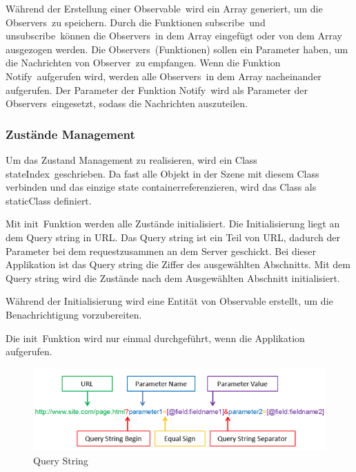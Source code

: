   Während der Erstellung einer \glqq Observable\grqq\ wird ein Array generiert, um die \glqq Observers\grqq\ zu speichern. Durch die Funktionen \glqq subscribe\grqq\ und \glqq unsubscribe\grqq\ können die \glqq Observers\grqq\ in dem Array eingefügt oder von dem Array ausgezogen werden. Die \glqq Observers\grqq\ (Funktionen) sollen ein Parameter haben, um die Nachrichten von \glqq Observer\grqq\ zu empfangen. Wenn die Funktion \glqq Notify\grqq\ aufgerufen wird, werden alle \glqq Observers\grqq\ in dem Array nacheinander aufgerufen. Der Parameter der Funktion \glqq Notify\grqq\ wird als Parameter der \glqq Observers\grqq\ eingesetzt, sodass die Nachrichten auszuteilen.
  
  \subsubsection{Zustände Management}
  
  Um das Zustand Management zu realisieren, wird ein Class \glqq stateIndex\grqq\ geschrieben. Da fast alle Objekt in der Szene mit diesem Class verbinden und das einzige \glqq state container\grqq referenzieren, wird das Class als \glqq static\grqq Class definiert.
  
  Mit \glqq init\grqq\ Funktion werden alle Zustände initialisiert. Die Initialisierung liegt an dem Query string in URL. Das Query string ist ein Teil von URL, dadurch der  Parameter bei dem \glqq request\grqq zusammen an dem Server geschickt. Bei dieser Applikation ist das Query string die Ziffer des ausgewählten Abschnitts. Mit dem Query string wird die Zustände nach dem Ausgewählten Abschnitt initialisiert.
  
  Während der Initialisierung wird eine Entität von Observable erstellt, um die Benachrichtigung vorzubereiten.
  
  Die \glqq init\grqq\ Funktion wird nur einmal durchgeführt, wenn die Applikation aufgerufen.
  
\begin{figure}[ht]
\centering
\includegraphics[width=\textwidth]{images/queryString.png}
\caption[Query String]{Query String}
\label{fig:queryString} 
\end{figure}
  
